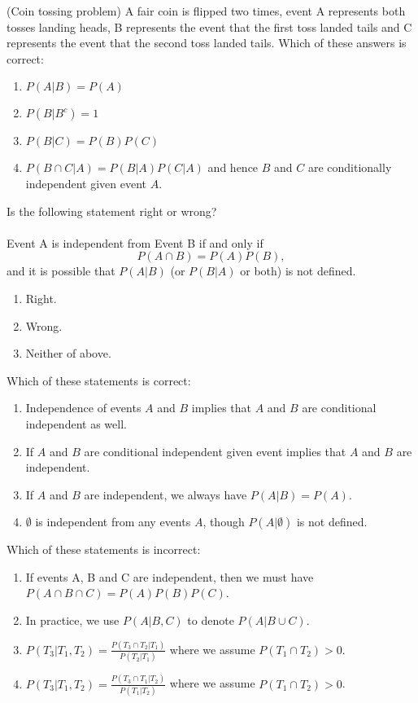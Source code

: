 \documentclass[poll_tutorial_format]{subfiles}
\begin{document}
\begin{exercise}
	(Coin tossing problem) A fair coin is flipped two times, event A represents both tosses landing heads, B represents the event that the first toss landed tails and C represents the event that the second toss landed tails. 
	Which of these answers is correct: 
	\begin{enumerate}
		\item $P(A|B)=P(A)$  
		\item $P(B|B^c)=1$
		\item $P(B| C)=P(B)P(C)$  
		\item $P(B\cap C|A)=P(B|A)P(C|A)$ and hence $B$ and $C$ are conditionally independent given event $A$.  
	\end{enumerate}
\end{exercise}


\begin{exercise} 
Is the following statement right or wrong?\\~\\ Event A is independent from Event B if and only if $$P(A\cap B)=P(A)P(B),$$ and it is possible that $P(A|B)$ (or $P(B|A)$ or both) is not defined. 
	\begin{enumerate}
		\item Right.
		\item  Wrong.
		\item Neither of above.
	\end{enumerate}
\end{exercise}


\begin{exercise} 
	Which of these statements is correct: 
	\begin{enumerate}
		\item Independence of events $A$ and $B$ implies that $A$ and $B$ are conditional independent as well.
		\item If $A$ and $B$ are conditional independent given event implies that $A$ and $B$ are independent. 
		\item If $A$ and $B$ are independent, we always have $P(A|B)=P(A)$. 
		\item  $\emptyset$ is independent from any events $A$, though $P(A|\emptyset)$ is not defined.
	\end{enumerate}
\end{exercise}


\begin{exercise}
	Which of these statements is incorrect: 
	\begin{enumerate}
		\item If events A, B and C are independent, then we must have $P(A\cap B\cap C)=P(A)P(B)P(C)$.
		\item In practice, we use $P(A|B,C)$ to denote $P(A|B\cup C)$. 
		\item $P(T_3|T_1,T_2)=\frac{P(T_3\cap T_2|T_1)}{P(T_2|T_1)}$ where we assume $P(T_1\cap T_2)>0$. 
		\item $P(T_3|T_1,T_2)=\frac{P(T_3\cap T_1|T_2)}{P(T_1|T_2)}$ where we assume $P(T_1\cap T_2)>0$. 
	\end{enumerate}
\end{exercise}

	
 	
	
	
\end{document}
